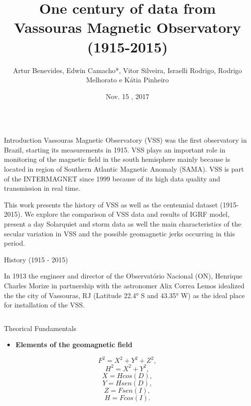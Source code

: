 \documentclass[final,t]{beamer}
\title{\huge One century of data from Vassouras Magnetic Observatory (1915-2015)}
\author[Benevides, Bassrei]{Artur Benevides, Edwin Camacho*, Vitor Silveira, Israelli Rodrigo, Rodrigo Melhorato e Kátia Pinheiro}
\institute[ON-MCTIC]{Observatório Nacional}
\date[Nov , 2017]{Nov. 15 , 2017}
\begin{document}
  \begin{columns}[t]
    \begin{column}{.66\linewidth}

\begin{block}{Introduction}
\justifying	
 Vassouras Magnetic Observatory (VSS) was the first observatory in Brazil, starting its measurements in 1915. VSS plays an important role in monitoring of the magnetic field in the south hemisphere mainly because is located in region of Southern Atlantic Magnetic Anomaly (SAMA). VSS is part of the INTERMAGNET since 1999 because of its high data quality and transmission in real time.
 
 This work presents the history of VSS as well as the centennial dataset (1915-2015). We	explore the comparison of VSS data and results of IGRF model, present a day Solarquiet and storm data as well the main characteristics of the secular variation in	VSS and the possible geomagnetic jerks occurring in this period.	
		

	
\end{block}

\begin{block}{History (1915 - 2015)}
	
In 1913 the engineer and director of the Observatório Nacional (ON), Henrique Charles Morize in partnership with the astronomer Alix Correa Lemos idealized the the city of Vassouras, RJ (Latitude 22.4° S and 43.35° W) as the ideal place for installation of the VSS.
	
	
	
\end{block}


\begin{columns}
	\begin{column}{.31\linewidth}
	
\begin{block}{Theorical Fundamentals}

\begin{itemize}
	\justifying
	
\begin{itemize}
	\justifying
	\item \bf{Elements of the geomagnetic field}
\end{itemize}	
\[ F^{2} = X^{2} + Y^{2} + Z^{2},\]
 \[  H^{2} = X^{2} + Y^{2}, \]
\[	   X = Hcos(D),\]
\[	   Y = Hsen(D),\]
\[	   Z = Fsen(I),\]
\[	   H = Fcos(I).\]
   	

\end{itemize}
\end{block}
\end{column}
\end{columns}
\end{column}
\end{columns}
\end{document}

